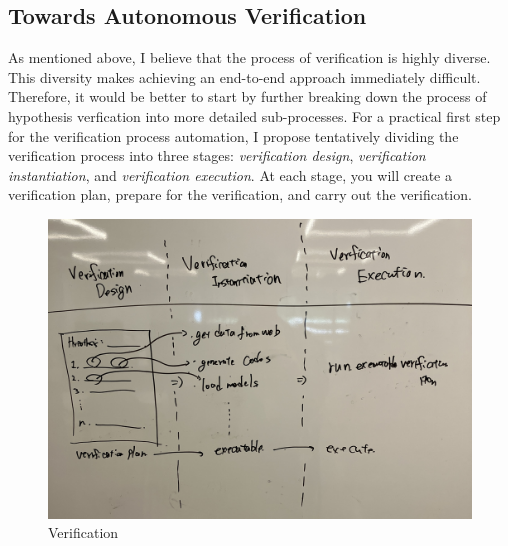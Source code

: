 

\subsection{Towards Autonomous Verification}

As mentioned above, I believe that the process of verification is highly diverse. This diversity makes achieving an end-to-end approach immediately difficult. Therefore, it would be better to start by further breaking down the process of hypothesis verfication into more detailed sub-processes. For a practical first step for the verification process automation, I propose tentatively dividing the verification process into three stages: \textit{verification design}, \textit{verification instantiation}, and \textit{verification execution}. At each stage, you will create a verification plan, prepare for the verification, and carry out the verification.

\begin{figure}[htb]
    \centering
    \includegraphics[width=\textwidth]{figs/verification.jpg}
    \caption{Verification}
    \label{fig:verification}
\end{figure}

